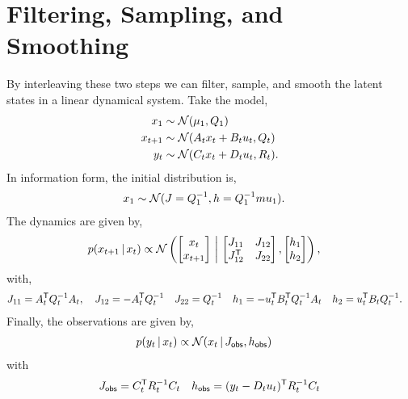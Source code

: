 \documentclass{article}
\begin{document}
\section*{Filtering, Sampling, and Smoothing}
By interleaving these two steps we can filter, sample, and smooth the latent states
in a linear dynamical system. Take the model,
\begin{align}
  x_1 &\sim \mathcal{N}(\mu_1, Q_1) \\
  x_{t+1} &\sim \mathcal{N}(A_t x_t + B_t u_t, Q_t) \\
  y_t &\sim \mathcal{N}(C_t x_t + D_t u_t, R_t).
\end{align}
In information form, the initial distribution is,
\begin{align}
  x_1 &\sim \mathcal{N}(J=Q_1^{-1}, h = Q_1^{-1} mu_1).
\end{align}
The dynamics are given by,
\begin{align}
  p(x_{t+1} \,|\, x_t) & \propto 
  \mathcal{N} \left(
  \begin{bmatrix} x_t \\ x_{t+1}  \end{bmatrix}
  \, \bigg| \,
  \begin{bmatrix} 
    J_{11}        & J_{12} \\
    J_{12}^{\mathsf{T}} & J_{22} 
  \end{bmatrix},
  \begin{bmatrix} h_{1} \\ h_2 \end{bmatrix}
  \right), 
\end{align}
with,
\begin{align}
  J_{11} &= A_t^{\mathsf{T}} Q_t^{-1} A_t, \quad 
  J_{12} = -A_t^{\mathsf{T}} Q_t^{-1} \quad
  J_{22} = Q_t^{-1} \quad
  h_1 = -u_t^{\mathsf{T}} B_t^{\mathsf{T}} Q_t^{-1} A_t \quad
  h_2 = u_t^{\mathsf{T}} B_t Q_t^{-1}.
\end{align}
Finally, the observations are given by,
\begin{align}
  p(y_t \,|\, x_t) 
  &\propto \mathcal{N}(x_t \,|\, J_{\sf obs}, h_{\sf obs}) 
\end{align}
with
\begin{align}
  J_{\sf obs} = C_t^{\mathsf{T}} R_t^{-1} C_t \quad
  h_{\sf obs} = (y_t - D_t u_t)^{\mathsf{T}} R_t^{-1} C_t
\end{align}
\end{document}

